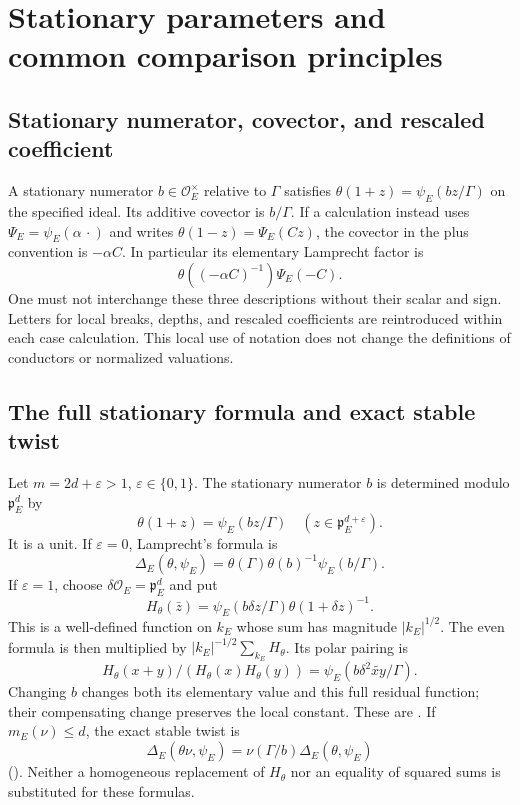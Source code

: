 \documentclass[11pt]{amsart}
\theoremstyle{definition}
\theoremstyle{remark}
\newcommand{\OO}{\mathcal O}\newcommand{\pp}{\mathfrak p}\newcommand{\PP}{\mathfrak P}
\begin{document}
\section{Stationary parameters and common comparison principles}\label{sec:stationary}
\subsection{Stationary numerator, covector, and rescaled coefficient}
A stationary numerator $b\in\OO_E^\times$ relative to $\Gamma$ satisfies
$\theta(1+z)=\psi_E(bz/\Gamma)$ on the specified ideal. Its additive
covector is $b/\Gamma$. If a calculation instead uses
$\Psi_E=\psi_E(\alpha\,\cdot)$ and writes
$\theta(1-z)=\Psi_E(Cz)$, the covector in the plus convention is
$-\alpha C$. In particular its elementary Lamprecht factor is
\[
 \theta((-\alpha C)^{-1})\Psi_E(-C).
\]
One must not interchange these three descriptions without their scalar
and sign. Letters for local breaks, depths, and rescaled coefficients are
reintroduced within each case calculation. This local use of notation does not change
the definitions of conductors or normalized valuations.

\subsection{The full stationary formula and exact stable twist}
Let $m=2d+\varepsilon>1$, $\varepsilon\in\{0,1\}$. The stationary
numerator $b$ is determined modulo $\pp_E^d$ by
\[
 \theta(1+z)=\psi_E(bz/\Gamma)
                         \quad(z\in\pp_E^{d+\varepsilon}).
\]
It is a unit. If $\varepsilon=0$, Lamprecht's formula is
\[
 \Delta_E(\theta,\psi_E)=\theta(\Gamma)\theta(b)^{-1}\psi_E(b/\Gamma).
\]
If $\varepsilon=1$, choose $\delta\OO_E=\pp_E^d$ and put
\[
 H_\theta(\bar z)=\psi_E(b\delta z/\Gamma)\theta(1+\delta z)^{-1}.
\]
This is a well-defined function on $k_E$ whose sum has magnitude
$|k_E|^{1/2}$. The even formula is then multiplied by
$|k_E|^{-1/2}\sum_{k_E}H_\theta$. Its polar pairing is
\[
 H_\theta(x+y)/(H_\theta(x)H_\theta(y))
       =\psi_E(b\delta^2\widetilde{xy}/\Gamma).
\]
Changing $b$ changes both its elementary value and this full residual
function; their compensating change preserves the local constant.
These are \cite[Theorem~4.5 and Lemma~4.6]{Ueda}.
If $m_E(\nu)\le d$, the exact stable twist is
\begin{equation}\label{U:stable}
 \Delta_E(\theta\nu,\psi_E)=\nu(\Gamma/b)\Delta_E(\theta,\psi_E)
\end{equation}
(\cite[Lemma~4.7]{Ueda}). Neither a homogeneous replacement of
$H_\theta$ nor an equality of squared sums is substituted for these formulas.
\end{document}
